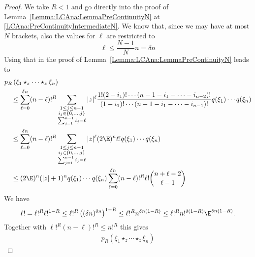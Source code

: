 \begin{proof}
    We take $R < 1$ and go directly into the proof of
    Lemma~\ref{Lemma:LCAna:LemmaPreContinuityN} at
    \eqref{LCAna:PreContinuityIntermediateN}.  We know that, since we
    may have at most $N$ brackets, also the values for $\ell$ are
    restricted to
    \begin{equation*}
        \ell
        \leq
        \frac{N-1}{N} n
        =
        \delta n
    \end{equation*}
    Using that in the proof of Lemma~\ref{Lemma:LCAna:LemmaPreContinuityN} 
    leads to
    \begin{align*}
        &p_R \left(
            \xi_1 \star_z \cdots \star_z \xi_n
        \right)
        \\
        &\quad\leq
        \sum\limits_{\ell = 0}^{\delta n}
        (n - \ell)!^R
        \sum\limits_{\substack{
			1 \leq j \leq n-1 \\
			i_j \in \{0, \ldots, j\} \\
			\sum_{j = 1}^{n - 1} i_j = \ell
		}}
        |z|^{\ell}
        \frac{1!  (2 - i_1)! \cdots (n-1 - i_1 - \cdots - i_{n-2})!}
        {(1 - i_1)! \cdots (n-1 - i_1 - \cdots - i_{n-1})!}
        q(\xi_1) \cdots q(\xi_n)
        \\
        &\quad\leq
        \sum\limits_{\ell = 0}^{\delta n}
        (n - \ell)!^R
        \sum\limits_{\substack{
			1 \leq j \leq n-1 \\
			i_j \in \{0, \ldots, j\} \\
			\sum_{j = 1}^{n - 1} i_j = \ell
		}}
        |z|^{\ell} (2 \E)^n \ell!
        q(\xi_1) \cdots q(\xi_n)
        \\
        &\quad\leq
        (2 \E)^n (|z| + 1)^n
        q(\xi_1) \cdots q(\xi_n)
        \sum\limits_{\ell = 0}^{\delta n}
        (n - \ell)!^R \ell!
        \binom{n + \ell - 2}{\ell - 1}
    \end{align*}
    We have
    \begin{equation*}
        \ell!
        =
        \ell!^R
        \ell!^{1-R}
        \leq
        \ell!^R
        \left(
            (\delta n)^{\delta n}
        \right)^{1-R}
        \leq
        \ell!^R
        n^{\delta n (1-R)}
        \leq
        \ell!^R
        n!^{\delta (1 - R)}
        \E^{\delta n (1 - R)}.
    \end{equation*}
    Together with $\ell!^R (n - \ell)!^R \leq n!^R$ this gives
    \begin{align*}
        p_R \left(
            \xi_1 \star_z \cdots \star_z \xi_n
        \right)

\end{align*}
\end{proof}
